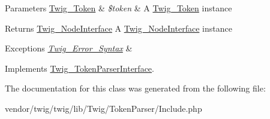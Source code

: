 \begin{DoxyParams}[1]{Parameters}
\hyperlink{classTwig__Token}{Twig\+\_\+\+Token} & {\em \$token} & A \hyperlink{classTwig__Token}{Twig\+\_\+\+Token} instance\\
\hline
\end{DoxyParams}
\begin{DoxyReturn}{Returns}
\hyperlink{interfaceTwig__NodeInterface}{Twig\+\_\+\+Node\+Interface} A \hyperlink{interfaceTwig__NodeInterface}{Twig\+\_\+\+Node\+Interface} instance
\end{DoxyReturn}

\begin{DoxyExceptions}{Exceptions}
{\em \hyperlink{classTwig__Error__Syntax}{Twig\+\_\+\+Error\+\_\+\+Syntax}} & \\
\hline
\end{DoxyExceptions}


Implements \hyperlink{interfaceTwig__TokenParserInterface_a9d003ebcca4a13c6f36b86e79815e823}{Twig\+\_\+\+Token\+Parser\+Interface}.



The documentation for this class was generated from the following file\+:\begin{DoxyCompactItemize}
\item 
vendor/twig/twig/lib/\+Twig/\+Token\+Parser/Include.\+php\end{DoxyCompactItemize}
